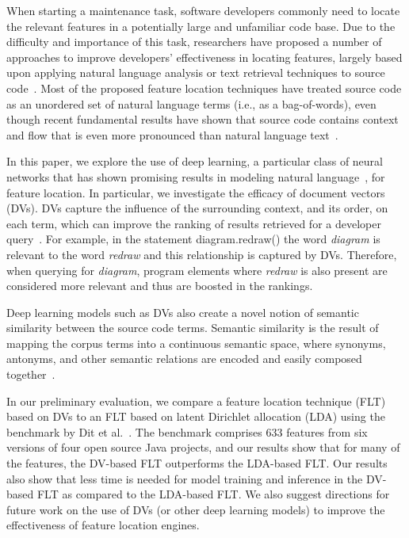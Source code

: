 
% 
%
When starting a maintenance task, software developers commonly need to
locate the relevant features in a potentially large and unfamiliar
code base. Due to the difficulty and importance of this task,
researchers have proposed a number of approaches to improve
developers' effectiveness in locating features, largely based upon
applying natural language analysis or text retrieval techniques to source
code~\cite{dit_feature_2013}. Most of the proposed feature location
techniques have treated source code as an unordered set of natural
language terms (i.e., as a bag-of-words), even though recent fundamental
results have shown that source code contains context and flow that is
even more pronounced than natural language
text~\cite{hindle_naturalness_2012}.


%
%
In this paper, we explore the use of deep learning, a particular class
of neural networks that has shown promising results in modeling
natural language~\cite{mikolov_distributed_2013}, for feature
location. In particular, we investigate the efficacy of document
vectors~\cite{le_distributed_2014} (DVs). DVs capture the influence of
the surrounding context, and its order, on each term, which can
improve the ranking of results retrieved for a developer
query~\cite{hill_use_2014}. For example, in the statement {\sf
diagram.redraw()} the word {\em diagram} is relevant to the word {\em
redraw} and this relationship is captured by DVs. Therefore, when
querying for {\em diagram}, program elements where {\em redraw} is
also present are considered more relevant and thus are boosted in the
rankings.

Deep learning models such as DVs also create a novel notion
of semantic similarity between the source code terms. Semantic
similarity is the result of mapping the corpus terms into a continuous
semantic space, where synonyms, antonyms, and other semantic relations
are encoded and easily composed together~\cite{le_distributed_2014}.


%
%

In our preliminary evaluation, we compare a feature location technique (FLT) based on DVs to an FLT based on latent Dirichlet allocation (LDA) using the benchmark by Dit et al.~\cite{Dit-etal_2013}.
The benchmark comprises 633 features from six versions of four open source Java projects, and our results show that for many of the features, the DV-based FLT outperforms the LDA-based FLT.
Our results also show that less time is needed for model training and inference in the DV-based FLT as compared to the LDA-based FLT.
We also suggest directions for future work on the use
of DVs (or other deep learning models) to improve the effectiveness of feature location engines.



